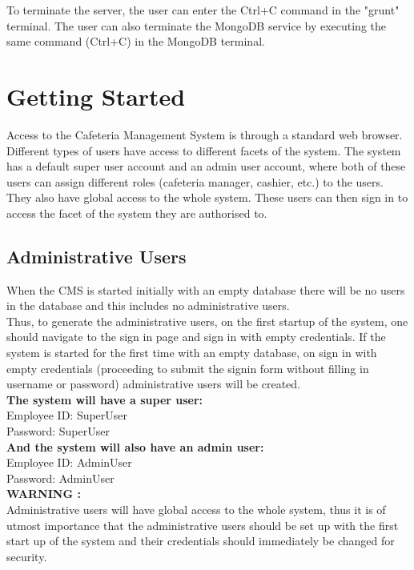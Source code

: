 \documentclass[a4paper,12pt]{report}
\begin{document}
To terminate the server, the user can enter the Ctrl+C command in the "grunt" terminal. The user can also terminate the MongoDB service by executing the same command (Ctrl+C) in the MongoDB terminal.

\section{Getting Started}
Access to the Cafeteria Management System is through a standard web browser. Different types of users have access to different facets of the system. The system has a default super user account and an admin user account, where both of these users can assign different roles (cafeteria manager, cashier, etc.) to the users. They also have global access to the whole system. These users can then sign in to access the facet of the system they are authorised to.\\

\subsection{Administrative Users}
When the CMS is started initially with an empty database there will be no users in the database and this includes no administrative users.  \\
Thus, to generate the administrative users, on the first startup of the system, one should navigate to the sign in page and sign in with empty credentials. If the system is started for the first time with an empty database, on sign in with empty credentials (proceeding to submit the signin form without filling in username or password) administrative users will be created. \\

\textbf{The system will have a super user:} \\
Employee ID: SuperUser \\
Password: SuperUser \\

\textbf{And the system will also have an admin user:} \\
Employee ID: AdminUser \\
Password: AdminUser \\

\textbf{WARNING :} \\
Administrative users will have global access to the whole system, thus it is of utmost importance that the administrative users should be set up with the first start up of the system and their credentials should immediately be changed for security. \\ 
\end{document}
